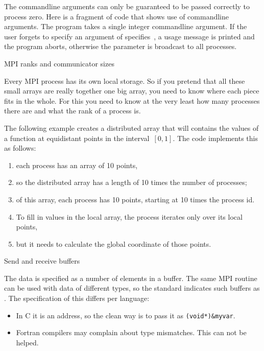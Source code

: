 The commandline arguments can only be guaranteed to be passed correctly to 
process zero. Here is a fragment of code that shows use of commandline arguments.
The program  takes a single integer commandline argument.
If the user forgets to specify an argument of specifies~, a usage message
is printed and the program aborts, otherwise the parameter is broadcast to 
all processes.

 {MPI ranks and communicator sizes}

Every MPI process has its own local storage. So if you pretend that all these
small arrays are really together one big array, you need to know where each 
piece fits in the whole. For this you need to know at the very least
how many processes there are and what the rank of a process is.

The following example creates a distributed array that will contains
the values of a function at equidistant points in the interval~$[0,1]$.
The code implements this as follows:
\begin{enumerate}
\item each process has an array of 10 points,
\item so the distributed array has a length of 10 times the number of processes;
\item of this array, each process has 10 points, starting at 10 times
  the process id.
\item To fill in values in the local array, the process iterates only
  over its local points,
\item but it needs to calculate the global coordinate of those points.
\end{enumerate}
 

 {Send and receive buffers}

The data is specified as a number of elements in a buffer. The same
MPI routine can be used with data of different types, so the standard
indicates such buffers as . The specification of
this differs per language:
\begin{itemize}
\item In C it is an address, so the clean way is to pass it as
  \verb+(void*)&myvar+.
\item Fortran compilers may complain about type mismatches. This can
  not be helped.
\end{itemize}

